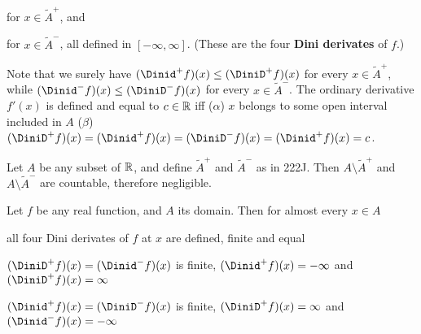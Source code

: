 \noindent for $x\in\tilde A^+$, and



\noindent for $x\in\tilde A^-$, all defined in $[-\infty,\infty]$.   
(These are the four {\bf Dini derivates} of $f$.)

Note that we surely have $(\Dinid^+f)(x)\le(\DiniD^+f)(x)$
for every $x\in\tilde A^+$, while 
$(\Dinid^-f)(x)\le(\DiniD^-f)(x)$
for every $x\in\tilde A^-$.   The ordinary derivative
$f'(x)$ is defined and equal to $c\in\Bbb R$ iff 
($\alpha$) $x$ belongs to some open interval included in $A$ ($\beta$)
$(\DiniD^+f)(x)=(\Dinid^+f)(x)=(\DiniD^-f)(x)
=(\Dinid^+f)(x)=c$.

 Let $A$ be any subset of $\Bbb R$, and define 
$\tilde A^+$ and $\tilde A^-$ as in 222J.   Then $A\setminus\tilde A^+$ and
$A\setminus\tilde A^-$ are countable, therefore negligible.


 Let $f$ be any real function, and $A$ its domain.  
Then for almost every $x\in A$

 all four Dini derivates of $f$ at $x$ are defined, 
finite and equal

 $(\DiniD^+f)(x)=(\Dinid^-f)(x)$ is finite,
$(\Dinid^+f)(x)=-\infty$ and $(\DiniD^+f)(x)=\infty$

 $(\Dinid^+f)(x)=(\DiniD^-f)(x)$ is finite,
$(\DiniD^+f)(x)=\infty$ and $(\Dinid^-f)(x)=-\infty$

